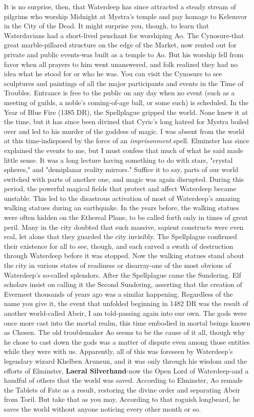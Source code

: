 \documentclass[10pt,a4paper,twoside,twocolumn,openany,nodeprecatedcode]{dndbook}
\begin{document}
It is no surprise, then, that Waterdeep has since attracted a steady stream of pilgrims who worship Midnight at Mystra's temple and pay homage to Kelemvor in the City of the Dead. It might surprise you, though, to learn that Waterdavians had a short-lived penchant for worshiping Ao. The Cynosure-that great marble-pillared structure on the edge of the Market, now rented out for private and public events-was built as a temple to Ao. But his worship fell from favor when all prayers to him went unanswered, and folk realized they had no idea what he stood for or who he was. You can visit the Cynosure to see sculptures and paintings of all the major participants and events in the Time of Troubles. Entrance is free to the public on any day when no event (such as a meeting of guilds, a noble's coming-of-age ball, or some such) is scheduled.
In the Year of Blue Fire (1385 DR), the Spellplague gripped the world. None knew it at the time, but it has since been divined that Cyric's long hatred for Mystra boiled over and led to his murder of the goddess of magic. I was absent from the world at this time-indisposed by the force of an \textit{imprisonment} spell. Elminster has since explained the events to me, but I must confess that much of what he said made little sense. It was a long lecture having something to do with stars, "crystal spheres," and "demiplanar reality mirrors." Suffice it to say, parts of our world switched with parts of another one, and magic was again disrupted.
During this period, the powerful magical fields that protect and affect Waterdeep became unstable. This led to the disastrous activation of most of Waterdeep's amazing walking statues during an earthquake. In the years before, the walking statues were often hidden on the Ethereal Plane, to be called forth only in times of great peril. Many in the city doubted that such massive, sapient constructs were even real, let alone that they guarded the city invisibly. The Spellplague confirmed their existence for all to see, though, and each carved a swath of destruction through Waterdeep before it was stopped. Now the walking statues stand about the city in various states of readiness or disarray-one of the most obvious of Waterdeep's so-called splendors.
After the Spellplague came the Sundering. Elf scholars insist on calling it the Second Sundering, asserting that the creation of Evermeet thousands of years ago was a similar happening. Regardless of the name you give it, the event that unfolded beginning in 1482 DR was the result of another world-called Abeir, I am told-passing again into our own. The gods were once more cast into the mortal realm, this time embodied in mortal beings known as Chosen. The old troublemaker Ao seems to be the cause of it all, though why he chose to cast down the gods was a matter of dispute even among those entities while they were with us.
Apparently, all of this was foreseen by Waterdeep's legendary wizard Khelben Arunsun, and it was only through his wisdom and the efforts of Elminster, \textbf{Laeral Silverhand}-now the Open Lord of Waterdeep-and a handful of others that the world was saved. According to Elminster, Ao remade the Tablets of Fate as a result, restoring the divine order and separating Abeir from Toril. But take that as you may. According to that roguish longbeard, he saves the world without anyone noticing every other month or so.
\end{document}
